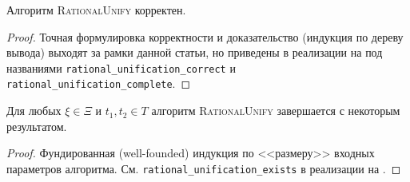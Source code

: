 \begin{theorem}[Корректность]
    Алгоритм \textsc{RationalUnify} корректен.
\end{theorem}
\begin{proof}
    Точная формулировка корректности и доказательство (индукция по дереву вывода) выходят за рамки данной статьи, но приведены в реализации на \Rocq под названиями \texttt{rational\_unification\_correct} и \texttt{rational\_unification\_complete}.
\end{proof}

\begin{theorem}[Завершаемость]
    Для любых $\xi \in \Xi$ и $t_1, t_2 \in T$ алгоритм \textsc{RationalUnify} завершается с некоторым результатом.
\end{theorem}
\begin{proof}
    Фундированная (well-founded) индукция по <<размеру>> входных параметров алгоритма. См. \texttt{rational\_unification\_exists} в реализации на \Rocq.
\end{proof}
